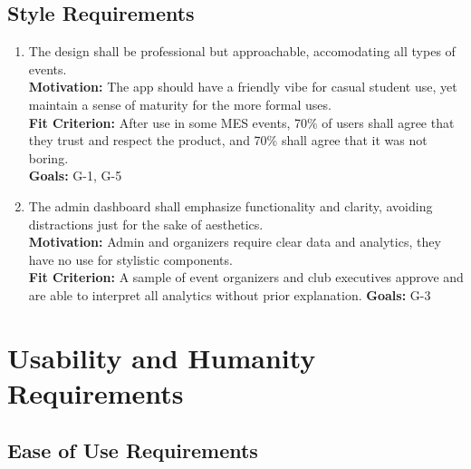 \documentclass[12pt]{article}
\begin{document}
\subsection{Style Requirements}
\begin{enumerate}[label=\bfseries SR-\arabic*:, wide=0pt, leftmargin=*, 
  ref=\bfseries LFR-S.\arabic*]
  \item \label{LFSR1} The design shall be professional but approachable, accomodating all types of events.\\[2mm]
    {\bf Motivation:} The app should have a friendly vibe for casual student use, yet maintain a sense of maturity for the more formal uses.\\
    {\bf Fit Criterion:} After use in some MES events, 70\% of users shall agree that they trust and respect the product, and 70\% shall agree that it was not boring.\\
    {\bf Goals:} G-1, G-5
  \item \label{LFSR2} The admin dashboard shall emphasize functionality and clarity, avoiding distractions just for the sake of aesthetics.\\[2mm]
    {\bf Motivation:} Admin and organizers require clear data and analytics, they have no use for stylistic components.\\
    {\bf Fit Criterion:} A sample of event organizers and club executives approve and are able to interpret all analytics without prior explanation.
    {\bf Goals:} G-3
\end{enumerate}

\section{Usability and Humanity Requirements}
\subsection{Ease of Use Requirements}
\end{document}
